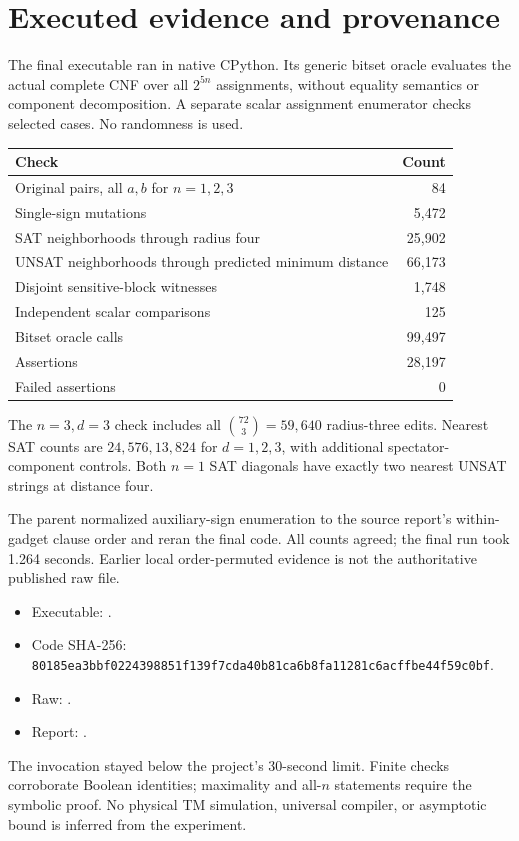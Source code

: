 \documentclass[11pt]{article}
\begin{document}
\section{Executed evidence and provenance}
The final executable ran in native CPython. Its generic bitset oracle evaluates the actual complete CNF over all \(2^{5n}\) assignments, without equality semantics or component decomposition. A separate scalar assignment enumerator checks selected cases. No randomness is used.

\begin{center}
\begin{tabular}{lr}\toprule
Check & Count\\\midrule
Original pairs, all \(a,b\) for \(n=1,2,3\) & 84\\
Single-sign mutations & 5,472\\
SAT neighborhoods through radius four & 25,902\\
UNSAT neighborhoods through predicted minimum distance & 66,173\\
Disjoint sensitive-block witnesses & 1,748\\
Independent scalar comparisons & 125\\
Bitset oracle calls & 99,497\\
Assertions & 28,197\\
Failed assertions & 0\\\bottomrule
\end{tabular}
\end{center}
The \(n=3,d=3\) check includes all \(\binom{72}{3}=59{,}640\) radius-three edits. Nearest SAT counts are \(24,576,13{,}824\) for \(d=1,2,3\), with additional spectator-component controls. Both \(n=1\) SAT diagonals have exactly two nearest UNSAT strings at distance four.

The parent normalized auxiliary-sign enumeration to the source report's within-gadget clause order and reran the final code. All counts agreed; the final run took 1.264 seconds. Earlier local order-permuted evidence is not the authoritative published raw file.
\begin{itemize}
\item[] Executable: .
\item[] Code SHA-256: \texttt{80185ea3bbf0224398851f139f7cda40b81ca6b8fa11281c6acffbe44f59c0bf}.
\item[] Raw: .
\item[] Report: .
\end{itemize}
The invocation stayed below the project's 30-second limit. Finite checks corroborate Boolean identities; maximality and all-\(n\) statements require the symbolic proof. No physical TM simulation, universal compiler, or asymptotic bound is inferred from the experiment.
\end{document}
